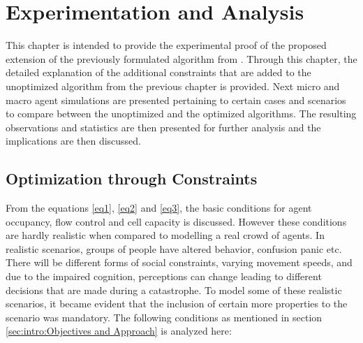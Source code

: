  \chapter{Experimentation and Analysis\label{ch:Experimentation and Analysis}}

This chapter is intended to provide the experimental proof of the proposed extension of the previously formulated algorithm from \cite{ref5}. Through this chapter, the detailed explanation of the additional constraints that are added to the unoptimized algorithm from the previous chapter is provided. Next micro and macro agent simulations are presented pertaining to certain cases and scenarios to compare between the unoptimized and the optimized algorithms. The resulting observations and statistics are then presented for further analysis and the implications are then discussed.

\section{Optimization through Constraints}
\label{sec: Optimization through Constraints}

From the equations \ref{eq1}, \ref{eq2} and \ref{eq3}, the basic conditions for agent occupancy, flow control and cell capacity is discussed. However these conditions are hardly realistic when compared to modelling a real crowd of agents. In realistic scenarios, groups of people have altered behavior, confusion panic etc. There will be different forms of social constraints, varying movement speeds, and due to the impaired cognition, perceptions can change leading to different decisions that are made during a catastrophe. To model some of these realistic scenarios, it became evident that the inclusion of certain more properties to the scenario was mandatory. The following conditions as mentioned in section \ref{sec:intro:Objectives and Approach} is analyzed here:

